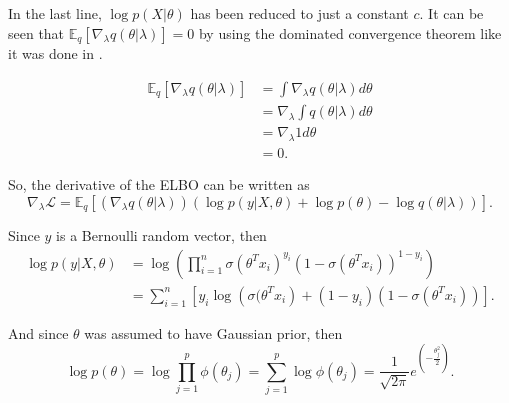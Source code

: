 In the last line, $\log p(X | \theta)$ has been reduced to just a constant $c$. It can be seen that $\mathbb{E}_q \left[ \nabla_{\lambda} q(\theta | \lambda) \right] = 0$ by using the dominated convergence theorem like it was done in \cite{ranganath2014black}.

\begin{equation}
  \begin{split}
      \mathbb{E}_q \left[ \nabla_{\lambda} q(\theta | \lambda) \right] &=
      \int \nabla_{\lambda} q(\theta | \lambda) d\theta \\
      &= \nabla_{\lambda} \int q(\theta | \lambda) d\theta \\
      &= \nabla_{\lambda} 1 d\theta \\
      &= 0.
  \end{split}
\end{equation}

So, the derivative of the ELBO can be written as
\begin{equation}
  \nabla_{\lambda} \mathcal{L} = \mathbb{E}_q \left[ \left( \nabla_{\lambda} q(\theta | \lambda) \right) \left( \log p(y | X, \theta) + \log p(\theta) - \log q(\theta | \lambda) \right) \right].
\end{equation}

Since $y$ is a Bernoulli random vector, then
\begin{equation}
  \begin{split}
      \log p(y | X, \theta) &=
      \log \left( \prod_{i = 1}^n \sigma(\theta^T x_i)^{y_i} (1 - \sigma(\theta^T x_i))^{1-y_i} \right) \\
      &= \sum_{i = 1}^n \left[ y_i \log \left( \sigma(\theta^T x_i \right) + (1 - y_i) (1 - \sigma(\theta^T x_i)) \right].
  \end{split}
\end{equation}

And since $\theta$ was assumed to have Gaussian prior, then
\begin{equation}
  \log p(\theta) = \log \prod_{j = 1}^p \phi(\theta_j) = \sum_{j = 1}^p \log \phi(\theta_j) = \frac{1}{\sqrt{2 \pi}} e^{\left( -\frac{\theta_j^2}{2} \right)}.
\end{equation}

